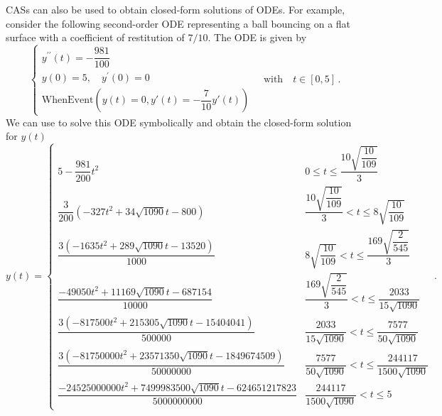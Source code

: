 \begin{example}
\acp{CAS} can also be used to obtain closed-form solutions of \acp{ODE}. For example, consider the following second-order \ac{ODE} representing a ball bouncing on a flat surface with a coefficient of restitution of $7/10$. The \ac{ODE} is given by
%
\begin{equation*}
  \begin{cases}
    y^{\prime\prime}(t) = -\dfrac{981}{100} \\[0.1em]
    y(0) = 5, \quad y^{\prime}(0) = 0 \\[0.1em]
    \mathrm{WhenEvent}(y(t) = 0, y'(t) = -\dfrac{7}{10}y'(t))
  \end{cases}
  \quad \text{with} \quad t \in [0, 5] \, \text{.}
\end{equation*}
%
We can use \Mathematica{} to solve this \ac{ODE} symbolically and obtain the closed-form solution for $y(t)$
%
\begin{equation*}
  y(t) = \begin{cases}
    5-\dfrac{981}{200}t^2 &
      0\leq t\leq \dfrac{10 \sqrt{\dfrac{10}{109}}}{3} \\[0.1em]
    \dfrac{3}{200} \left(-327 t^2+34 \sqrt{1090} t-800\right) &
      \dfrac{10\sqrt{\dfrac{10}{109}}}{3}<t\leq 8 \sqrt{\dfrac{10}{109}} \\[0.1em]
    \dfrac{3 \left(-1635 t^2+289 \sqrt{1090} t-13520\right)}{1000} &
      8\sqrt{\dfrac{10}{109}}<t\leq \dfrac{169 \sqrt{\dfrac{2}{545}}}{3} \\[0.1em]
    \dfrac{-49050 t^2+11169 \sqrt{1090} t-687154}{10000} &
      \dfrac{169\sqrt{\dfrac{2}{545}}}{3}<t\leq \dfrac{2033}{15 \sqrt{1090}} \\[0.1em]
    \dfrac{3 \left(-817500 t^2+215305 \sqrt{1090} t-15404041\right)}{500000} &
      \dfrac{2033}{15\sqrt{1090}}<t\leq \dfrac{7577}{50 \sqrt{1090}} \\[0.1em]
    \dfrac{3 \left(-81750000 t^2+23571350 \sqrt{1090} t-1849674509\right)}{50000000} &
      \dfrac{7577}{50 \sqrt{1090}}<t\leq \dfrac{244117}{1500 \sqrt{1090}} \\[0.1em]
    \dfrac{-24525000000 t^2+7499983500 \sqrt{1090} t-624651217823}{5000000000} &
      \dfrac{244117}{1500 \sqrt{1090}}<t\leq 5
    \end{cases} \, \text{.}
\end{equation*}


\end{example}
